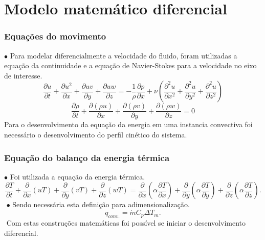 \documentclass[xcolor=dvipsnames,10pt,aspectratio=169]{beamer}
\begin{document}
	

	
	\section{Modelo matemático diferencial}
	
	
	
	
		
		\begin{frame}
		\frametitle{Equações do movimento}
		$\bullet$ Para modelar diferencialmente a velocidade do fluido, foram utilizadas a equação da continuidade e a equação de Navier-Stokes para a velocidade no eixo de interesse.
		\begin{equation}
		\frac{\partial u}{\partial t} + \frac{\partial u^2}{\partial x} + \frac{\partial uv}{\partial y} + \frac{\partial uw}{\partial z} = - \frac{1}{\rho} \frac{\partial {p}}{\partial x} + \nu \left( \frac{\partial^2 u}{\partial x^2} + \frac{\partial^2 u}{\partial y^2} + \frac{\partial^2 u}{\partial z^2}   \right)
		\end{equation}
		\begin{equation}
		\frac{\partial \rho}{\partial t} +  \frac{\partial (\rho u)}{\partial x} + \frac{\partial (\rho v)}{\partial y} + \frac{\partial (\rho w)}{\partial z} = 0
		\end{equation}
		Para o desenvolvimento da equação da energia em uma instancia convectiva foi necessário o desenvolvimento do perfil cinético do sistema.
		\end{frame}

		



		\begin{frame}
		\frametitle{Equação do balanço da energia térmica}
		$\bullet$ Foi utilizada a equação da energia térmica.
		\begin{equation}
		\frac{\partial T}{\partial t} + {\frac{\partial{}}{\partial{x}} (uT)} + {\frac{\partial{}}{\partial{y}} (vT)} + {\frac{\partial{}}{\partial{z}} (wT)}
		=
		{\frac{\partial{}}{\partial{x}}} \left(\alpha {\frac{\partial{T}}{\partial{x}}} \right) +
		{\frac{\partial{}}{\partial{y}}} \left(\alpha {\frac{\partial{T}}{\partial{y}}} \right) +
		{\frac{\partial{}}{\partial{z}}} \left(\alpha {\frac{\partial{T}}{\partial{z}}} \right) .
		\end{equation}
		$ $
		$\bullet$ Sendo necessária esta definição para adimensionalização.
		\begin{equation}\label{c_h_e}
		q_{conv.} = \dot{m} C_p \Delta T_m.
		\end{equation}
		$ $
		Com estas construções matemáticas foi possível se iniciar o desenvolvimento diferencial.
		\end{frame}
\end{document}
